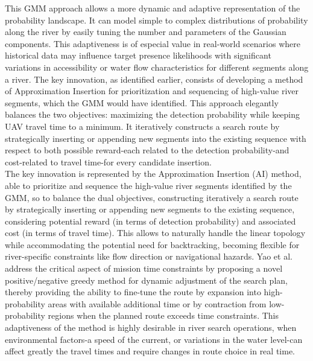 \documentclass[conference]{IEEEtran}
\begin{document}
This GMM approach allows a more dynamic and adaptive representation of the probability landscape. It can model simple to complex distributions of probability along the river by easily tuning the number and parameters of the Gaussian components. This adaptiveness is of especial value in real-world scenarios where historical data may influence target presence likelihoods with significant variations in accessibility or water flow characteristics for different segments along a river. The key innovation, as identified earlier, consists of developing a method of Approximation Insertion for prioritization and sequencing of high-value river segments, which the GMM would have identified. This approach elegantly balances the two objectives: maximizing the detection probability while keeping UAV travel time to a minimum. It iteratively constructs a search route by strategically inserting or appending new segments into the existing sequence with respect to both possible reward-each related to the detection probability-and cost-related to travel time-for every candidate insertion. \\

The key innovation is represented by the Approximation Insertion (AI) method, able to prioritize and sequence the high-value river segments identified by the GMM, so to balance the dual objectives, constructing iteratively a search route by strategically inserting or appending new segments to the existing sequence, considering potential reward (in terms of detection probability) and associated cost (in terms of travel time). This allows to naturally handle the linear topology while accommodating the potential need for backtracking, becoming flexible for river-specific constraints like flow direction or navigational hazards. Yao et al. address the critical aspect of mission time constraints by proposing a novel positive/negative greedy method for dynamic adjustment of the search plan, thereby providing the ability to fine-tune the route by expansion into high-probability areas with available additional time or by contraction from low-probability regions when the planned route exceeds time constraints. This adaptiveness of the method is highly desirable in river search operations, when environmental factors-a speed of the current, or variations in the water level-can affect greatly the travel times and require changes in route choice in real time. \\
\end{document}
